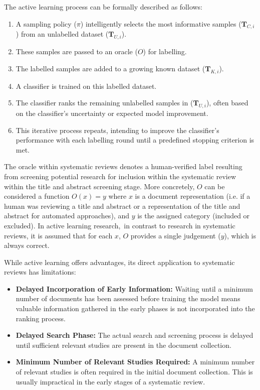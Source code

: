 \documentclass[10pt,oneside]{book}
\begin{document}
\begin{tcolorbox}[title=The General Active Learning Process]  
\small
The active learning process can be formally described as follows:

\begin{enumerate}
    \item A sampling policy ($\pi$) intelligently selects the most informative samples ($\mathbf{T}_{C,i}$) from an unlabelled dataset ($\mathbf{T}_{U,i}$).
    \item These samples are passed to an oracle ($O$) for labelling.
    \item The labelled samples are added to a growing known dataset ($\mathbf{T}_{K,i}$).
    \item A classifier is trained on this labelled dataset.
    \item The classifier ranks the remaining unlabelled samples in ($\mathbf{T}_{U,i}$), often based on the classifier's uncertainty or expected model improvement.
    \item This iterative process repeats, intending to improve the classifier's performance with each labelling round until a predefined stopping criterion is met.
\end{enumerate}
\end{tcolorbox}
The oracle within systematic reviews denotes a human-verified label resulting from screening potential research for inclusion within the systematic review within the title and abstract screening stage. More concretely, $O$ can be considered a function $O(x) = y$ where $x$ is a document representation (i.e. if a human was reviewing a title and abstract or a representation of the title and abstract for automated approaches), and $y$ is the assigned category (included or excluded). In active learning research, in contrast to research in systematic reviews, it is assumed that for each $x$, $O$ provides a single judgement ($y$), which is always correct.




While active learning offers advantages, its direct application to systematic reviews has limitations:

\begin{itemize}
    \item \textbf{Delayed Incorporation of Early Information:} Waiting until a minimum number of documents has been assessed before training the model means valuable information gathered in the early phases is not incorporated into the ranking process.
    \item \textbf{Delayed Search Phase:} The actual search and screening process is delayed until sufficient relevant studies are present in the document collection.
    \item \textbf{Minimum Number of Relevant Studies Required:} A minimum number of relevant studies is often required in the initial document collection. This is usually impractical in the early stages of a systematic review.
\end{itemize}
\end{document}
